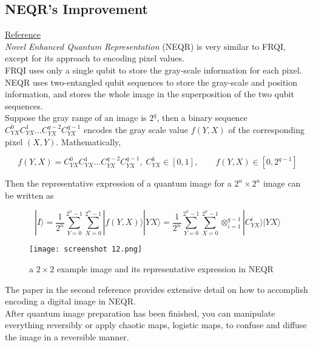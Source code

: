 \documentclass[svgnames]{article}     %
\begin{document}
\subsection{NEQR's Improvement} 

\href{https://zero.sci-hub.se/2180/25c5b2e7104ba68813ee5fc81176fb62/zhang2013.pdf}{Reference}\\

\textit{Novel Enhanced Quantum Representation} (NEQR) is very similar to FRQI,
except for its approach to encoding pixel values. \\

FRQI uses only a single qubit to store the gray-scale information for each
pixel. NEQR uses two-entangled qubit sequences to store the gray-scale and
position information, and stores the whole image in the superposition of the
two qubit sequences. \\

Suppose the gray range of an image is $2^q$, then a binary sequence  $C_{YX}^0
C_{YX}^1 \hdots C_{YX}^{q-2} C_{YX}^{q-1}$ encodes the gray scale value  $f(Y,
X)$ of the corresponding pixel $(X, Y)$. Mathematically, 

\[
  f(Y, X) = C_{YX}^0 C_{YX}^1 \hdots C_{YX}^{q-2} C_{YX}^{q-1}, \; C_{YX}^k \in
  [0, 1], \qquad f(Y, X) \in [0, 2^{q-1}]
\] \vspace{3px}

Then the representative expression of a quantum image for a $2^n \times 2^n$
image can be written as 

 \[
|I\rangle = \frac{1}{2^n} \sum_{Y=0}^{2^n - 1} \sum_{X=0}^{2^n - 1} |f(Y,
X)\rangle |YX\rangle = \frac{1}{2^n} \sum_{Y=0}^{2^n - 1} \sum_{X=0}^{2^n-1}
\otimes_{i=1}^{q-1} |C_{YX}^i\rangle |YX\rangle     
\] \vspace{3px}
\begin{figure}[H]
  \centering
    \texttt{[image: screenshot 12.png]}
    \caption{a $2\times 2$ example image and its representative expression in
    NEQR}
\end{figure}

The paper in the second reference provides extensive detail on how to
accomplish encoding a digital image in NEQR. \\

After quantum image preparation has been finished, you can manipulate
everything reversibly or apply chaotic maps, logistic maps, to confuse and
diffuse the image in a reversible manner. \\
\end{document}
